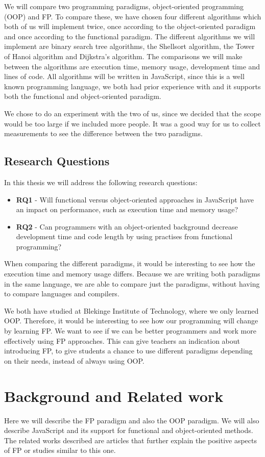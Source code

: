 \documentclass {article}
\begin{document}
We will compare two programming paradigms, object-oriented programming (OOP) and FP. To compare these, we have chosen four different algorithms which both of us will implement twice, once according to the object-oriented paradigm and once according to the functional paradigm. The different algorithms we will implement are binary search tree algorithms, the Shellsort algorithm, the Tower of Hanoi algorithm and Dijkstra's algorithm. The comparisons we will make between the algorithms are execution time, memory usage, development time and lines of code. All algorithms will be written in JavaScript, since this is a well known programming language, we both had prior experience with and it supports both the functional and object-oriented paradigm. 
 
We chose to do an experiment with the two of us, since we decided that the scope would be too large if we included more people. It was a good way for us to collect measurements to see the difference between the two paradigms.
\subsection{Research Questions}
In this thesis we will address the following research questions:
\begin{itemize}
\item \textbf{RQ1} - Will functional versus object-oriented approaches in JavaScript have an impact on performance, such as execution time and memory usage?
\item \textbf{RQ2} - Can programmers with an object-oriented background decrease development time and code length by using practises from functional programming?
\end{itemize}
 
When comparing the different paradigms, it would be interesting to see how the execution time and memory usage differs. Because we are writing both paradigms in the same language, we are able to compare just the paradigms, without having to compare languages and compilers.
 
We both have studied at Blekinge Institute of Technology, where we only learned OOP. Therefore, it would be interesting to see how our programming will change by learning FP. We want to see if we can be better programmers and work more effectively using FP approaches. This can give teachers an indication about introducing FP, to give students a chance to use different paradigms depending on their needs, instead of always using OOP.
\newpage 
\section{Background and Related work}
Here we will describe the FP paradigm and also the OOP paradigm. We will also describe JavaScript and its support for functional and object-oriented methods. The related works described are articles that further explain the positive aspects of FP or studies similar to this one.
\end{document}
